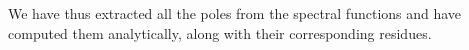 We have thus extracted all the poles from the spectral functions and have computed them analytically, along with their corresponding residues.

